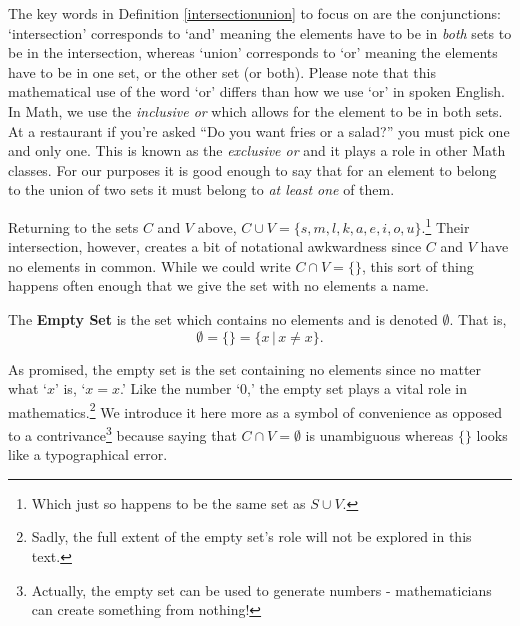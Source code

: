 \documentclass{ximera}
\begin{document}

 

The key words in Definition \ref{intersectionunion} to focus on are the conjunctions:  `intersection' corresponds to `and' meaning the elements have to be in \textit{both} sets to be in the intersection, whereas `union' corresponds to `or' meaning the elements have to be in one set, or the other set (or both).  Please note that this mathematical use of the word `or' differs than how we use `or' in spoken English.  In Math, we use the \emph{inclusive or} which allows for the element to be in both sets.  At a restaurant if you're asked ``Do you want fries or a salad?'' you must pick one and only one.  This is known as the \emph{exclusive or} and it plays a role in other Math classes.  For our purposes it is good enough to say that for an element to belong to the union of two sets it must belong to \textit{at least one} of them.

 

Returning to the sets $C$ and $V$  above, $C \cup V = \{ s, m, l, k, a, e, i, o, u\}$.\footnote{Which just so happens to be the same set as $S \cup V$.}  Their intersection, however, creates a bit of notational awkwardness since $C$ and $V$ have no elements in common.  While we could write $C \cap V = \{ \}$, this sort of thing happens often enough that we give the set with no elements a name. 

 


\begin{definition} \label{emptysetdefn}

The \textbf{Empty Set} is the set which contains no elements and is denoted $\emptyset$.  That is, \[\emptyset=\{ \}=\{x\,|\,\mbox{$x \neq x$}\}.\]  

\end{definition}


 

As promised, the empty set is the set containing no elements since no matter what `$x$' is, `$x = x$.'  Like the number `$0$,'  the empty set plays a vital role in mathematics.\footnote{Sadly, the full extent of the empty set's role will not be explored in this text.} We introduce it here more as a symbol of convenience as opposed to a contrivance\footnote{Actually, the empty set can be used to generate numbers -  mathematicians can create something from nothing!} because saying that $C \cap V = \emptyset$ is unambiguous whereas $\{ \}$ looks like a typographical error.    
\end{document}
